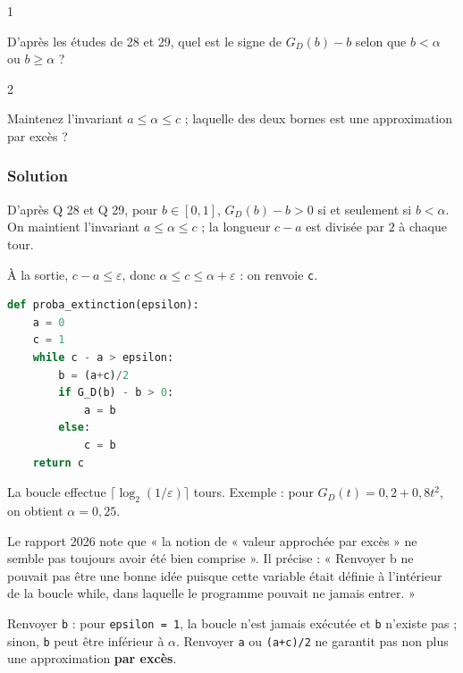 \documentclass[11pt,a4paper]{article}
\begin{document}
\begin{indication}{1}

D'après les études de 28 et 29, quel est le signe de \(G_D(b)-b\) selon que \(b<\alpha\) ou \(b\ge\alpha\) ?

\end{indication}

\begin{indication}{2}

Maintenez l'invariant \(a\le\alpha\le c\) ; laquelle des deux bornes est une approximation par excès ?

\end{indication}

\hypertarget{solution-72}{%
\subsubsection{Solution}\label{solution-72}}

D'après Q 28 et Q 29, pour \(b\in[0,1]\), \(G_D(b)-b>0\) si et seulement si \(b<\alpha\). On maintient l'invariant \(a\le\alpha\le c\) ; la longueur \(c-a\) est divisée par \(2\) à chaque tour.

À la sortie, \(c-a\le\varepsilon\), donc \(\alpha\le c\le\alpha+\varepsilon\) : on renvoie \texttt{c}.

\begin{lstlisting}[language=Python]
def proba_extinction(epsilon):
    a = 0
    c = 1
    while c - a > epsilon:
        b = (a+c)/2
        if G_D(b) - b > 0:
            a = b
        else:
            c = b
    return c
\end{lstlisting}

La boucle effectue \(\lceil\log_2(1/\varepsilon)\rceil\) tours. Exemple : pour \(G_D(t)=0{,}2+0{,}8t^2\), on obtient \(\alpha=0{,}25\).

\begin{jury}

Le rapport 2026 note que « la notion de « valeur approchée par excès » ne semble pas toujours avoir été bien comprise ». Il précise : « Renvoyer b ne pouvait pas être une bonne idée puisque cette variable était définie à l'intérieur de la boucle while, dans laquelle le programme pouvait ne jamais entrer. »

\end{jury}

\begin{piege}

Renvoyer \texttt{b} : pour \texttt{epsilon\ =\ 1}, la boucle n'est jamais exécutée et \texttt{b} n'existe pas ; sinon, \texttt{b} peut être inférieur à \(\alpha\). Renvoyer \texttt{a} ou \texttt{(a+c)/2} ne garantit pas non plus une approximation \textbf{par excès}.

\end{piege}
\end{document}
